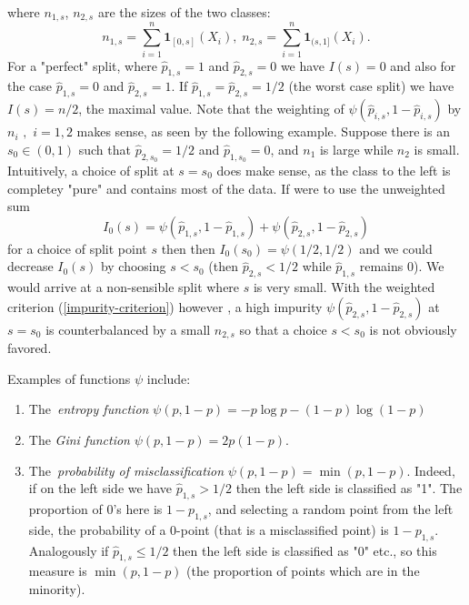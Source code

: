 \documentclass[11pt,twoside]{article}%
\theoremstyle{change}
\begin{document}
where $n_{1,s}$, $n_{2,s}$ are the sizes of the two classes:
\[
n_{1,s}=\sum_{i=1}^{n}\mathbf{1}_{[0,s]}(X_{i}),\;n_{2,s}=\sum_{i=1}%
^{n}\mathbf{1}_{(s,1]}(X_{i}).
\]
For a "perfect" split, where $\hat{p}_{1,s}=1$ and $\hat{p}_{2,s}=0$ we have
$I(s)=0$ and also for the case $\hat{p}_{1,s}=0$ and $\hat{p}_{2,s}=1$. If
$\hat{p}_{1,s}=\hat{p}_{2,s}=1/2$ (the worst case split) we have $I(s)=n/2$,
the maximal value. Note that the weighting of $\psi\left(  \hat{p}%
_{i,s},1-\hat{p}_{i,s}\right)  $ by $n_{i}$ $,$ $i=1,2$ makes sense, as seen
by the following example. Suppose there is an $s_{0}\in(0,1)$ such that
$\hat{p}_{2,s_{0}}=1/2$ and $\hat{p}_{1,s_{0}}=0$, and $n_{1}$ is large while
$n_{2} $ is small. Intuitively, a choice of split at $s=s_{0}$ does make
sense, as the class to the left is completey "pure" and contains most of the
data. If were to use the unweighted sum
\[
I_{0}(s)=\psi\left(  \hat{p}_{1,s},1-\hat{p}_{1,s}\right)  +\psi\left(
\hat{p}_{2,s},1-\hat{p}_{2,s}\right)
\]
for a choice of split point $s$ then then $I_{0}(s_{0})=\psi\left(
1/2,1/2\right)  $ and we could decrease $I_{0}(s)$ by choosing $s<s_{0}$ (then
$\hat{p}_{2,s}<1/2$ while $\hat{p}_{1,s}$ remains $0$). We would arrive at a
non-sensible split where $s$ is very small. With the weighted criterion
(\ref{impurity-criterion}) however , a high impurity $\psi\left(  \hat
{p}_{2,s},1-\hat{p}_{2,s}\right)  $ at $s=s_{0}$ is counterbalanced by a small
$n_{2,s}$ so that a choice $s<s_{0}$ is not obviously favored.

Examples of functions $\psi$ include:

\begin{enumerate}
\item The\textit{\ entropy function} $\psi(p,1-p)=-p\log p-(1-p)\log(1-p)$

\item The \textit{Gini function }$\psi(p,1-p)=2p(1-p)$.

\item The\textit{\ probability of misclassification} $\psi(p,1-p)=\min
(p,1-p)$. Indeed, if on the left side we have $\hat{p}_{1,s}>1/2$ then the
left side is classified as "1". The proportion of $0$'s here is $1-p_{1,s}$,
and selecting a random point from the left side, the probability of a
$0$-point (that is a misclassified point) is $1-p_{1,s}$. Analogously if
$\hat{p}_{1,s}\leq1/2$ then the left side is classified as "0" etc., so this
measure is $\min(p,1-p)$ (the proportion of points which are in the minority).
\end{enumerate}
\end{document}
